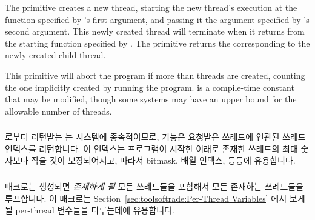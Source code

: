 The  primitive creates a new thread,
starting the new thread's execution
at the function  specified by 's
first argument, and passing it the argument specified by
's second argument.
This newly created thread will terminate when it returns from the
starting function specified by .
The  primitive returns the 
corresponding to the newly created child thread.

This primitive will abort the program if more than 
threads are created, counting the one implicitly created by running
the program.
 is a compile-time constant that may be modified,
though some systems may have an upper bound for the allowable number
of threads.
\fi

\subsubsection{}

 로부터 리턴받는  는 시스템에 종속적이므로,
 기능은 요청받은 쓰레드에 연관된 쓰레드 인덱스를
리턴합니다.
이 인덱스는 프로그램이 시작한 이래로 존재한 쓰레드의 최대 숫자보다 작을 것이
보장되어지고, 따라서 bitmask, 배열 인덱스, 등등에 유용합니다.

\subsubsection{}

 매크로는 생성되면 \emph{존재하게 될} 모든 쓰레드들을
포함해서 모든 존재하는 쓰레드들을 루프합니다.
이 매크로는 Section~\ref{sec:toolsoftrade:Per-Thread Variables} 에서 보게 될
per-thread 변수들을 다루는데에 유용합니다.

